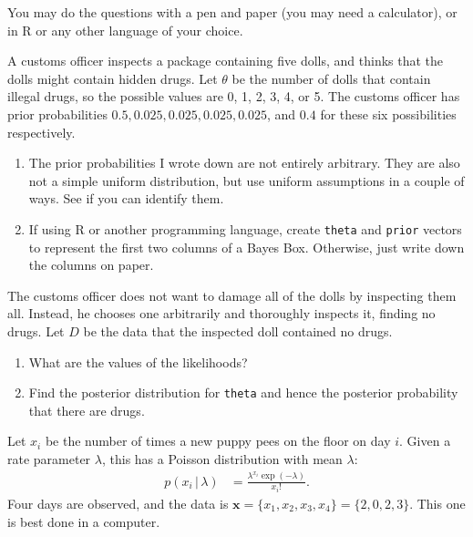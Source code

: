 \documentclass[12pt]{article}
\makeatletter
\def\BackgroundEPS#1#2#3#4{%
    \special{ps: @beginspecial @setspecial initmatrix
                0.9 setgray #2 #3 translate #4 dup scale}
    \special{ps: plotfile #1}
    \special{ps: @endspecial}
}
\newcommand{\given}{\,|\,}
\makeatother
\begin{document}
\makeband
You may do the questions with a pen and paper (you may need a calculator),
or in R or any other language of your choice.

\begin{Questions}

\item 
A customs officer inspects a package containing five dolls, and thinks
that the dolls might contain hidden drugs. Let $\theta$ be the number of dolls
that contain illegal drugs, so the possible values are 0, 1, 2, 3, 4, or 5.
The customs officer has prior probabilities
$0.5, 0.025, 0.025, 0.025, 0.025$, and $0.4$ for these six possibilities
respectively.

\begin{enumerate}
\item [(a)] The prior probabilities I wrote down are not entirely arbitrary.
They are also not a simple uniform distribution, but use uniform
assumptions in a couple of ways. See if you can identify them.

\item [(b)] If using R or another programming language,
create {\tt theta} and {\tt prior} vectors to represent the first two
columns of a Bayes Box. Otherwise, just write down the columns on paper.
\end{enumerate}

The customs officer does not want to damage all of the dolls by inspecting them
all. Instead, he chooses one
arbitrarily and thoroughly inspects it, finding no drugs. Let $D$
be the data that the inspected doll contained no drugs.

\begin{enumerate}
\item[(c)] What are the values of the likelihoods?
\item[(d)] Find the posterior distribution for {\tt theta} and hence the posterior
probability that there are drugs.
\end{enumerate}


\item 
Let $x_i$ be the number of times a new puppy pees on the floor on
day $i$. Given a rate parameter $\lambda$, this has a Poisson
distribution with mean $\lambda$:
\begin{align}
p(x_i \given \lambda) &= \frac{\lambda^{x_i}\exp(-\lambda)}{x_i!}.
\end{align}
Four days are observed, and the data is
$\boldsymbol{x} = \{x_1, x_2, x_3, x_4\} = \{2, 0, 2, 3\}$.
This one is best done in a computer.


\end{Questions}
\end{document}
